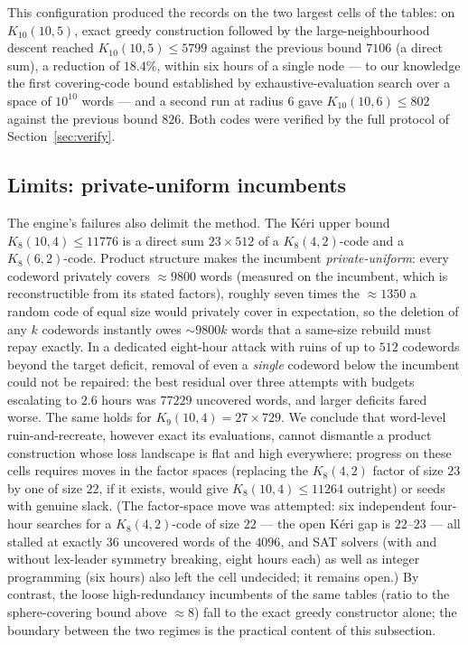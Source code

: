 \documentclass[11pt]{amsart}
\newcommand{\Kq}[3]{K_{#1}(#2,#3)}
\begin{document}
This configuration produced the records on the two largest cells of the
tables: on
$\Kq{10}{10}{5}$, exact greedy construction followed
by the large-neighbourhood descent reached $\Kq{10}{10}{5}\le 5799$ against
the previous bound $7106$ (a direct sum), a reduction of $18.4\%$, within
six hours of a single node --- to our knowledge the first covering-code
bound established by exhaustive-evaluation search over a space of $10^{10}$
words --- and a second run at radius $6$ gave
$\Kq{10}{10}{6}\le 802$ against the previous bound $826$. Both codes were
verified by the full protocol of Section~\ref{sec:verify}.

\subsection{Limits: private-uniform incumbents}\label{sec:gpu:rigid}

The engine's failures also delimit the method. The
K\'eri upper bound $\Kq{8}{10}{4}\le 11776$ is a direct sum
$23\times 512$ of a $\Kq{8}{4}{2}$-code and a $\Kq{8}{6}{2}$-code. Product
structure makes the incumbent \emph{private-uniform}: every codeword
privately covers ${\approx}9800$ words (measured on the incumbent, which
is reconstructible from its stated factors), roughly seven times the
${\approx}1350$ a random code of equal size would privately cover in
expectation, so the deletion of any $k$ codewords instantly
owes ${\sim}9800k$ words that a same-size rebuild must repay exactly. In a
dedicated eight-hour attack with ruins of up to $512$ codewords beyond the
target deficit, removal of even a \emph{single} codeword below the
incumbent could not be repaired: the best residual over three attempts
with budgets escalating to $2.6$ hours was $77229$ uncovered words, and
larger deficits fared worse. The same holds for
$\Kq{9}{10}{4}=27\times 729$. We conclude that word-level
ruin-and-recreate, however exact its evaluations, cannot dismantle a
product construction whose loss landscape is flat and high everywhere;
progress on
these cells requires moves in the factor spaces (replacing the
$\Kq{8}{4}{2}$ factor of size $23$ by one of size $22$, if it exists,
would give $\Kq{8}{10}{4}\le 11264$ outright) or seeds with genuine slack. (The factor-space move was attempted: six independent
four-hour searches for a $\Kq{8}{4}{2}$-code of size $22$ --- the open
K\'eri gap is $22$--$23$ --- all stalled at exactly $36$ uncovered words
of the $4096$, and SAT solvers (with and without lex-leader symmetry
breaking, eight hours each) as well as integer programming (six hours)
also left the cell undecided; it remains open.)
By contrast, the loose high-redundancy incumbents of the same tables
(ratio to the sphere-covering bound above ${\approx}8$) fall to the exact
greedy constructor alone; the boundary between the two regimes is the
practical content of this subsection.
\end{document}
